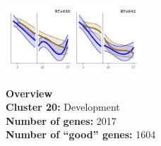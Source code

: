 \begin{multicols}{2}
\includegraphics[width=2in]{figures/clusters/root_Preflowering_19.png}
\columnbreak

\noindent \textbf{Overview}\\\textbf{Cluster 20:} Development \\
\textbf{Number of genes:} 2017 \\
\textbf{Number of ``good'' genes:} 1604 \\
\end{multicols}


